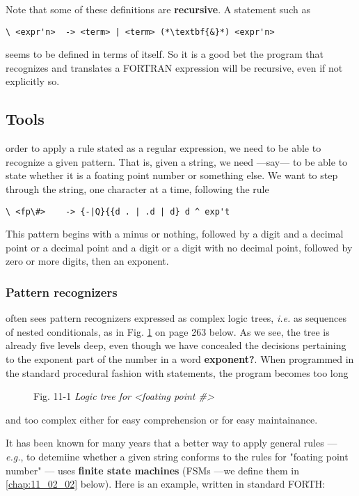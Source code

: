 Note that some of these definitions are \textbf{recursive}. A statement such as

\begin{verbatim}
\ <expr'n>  -> <term> | <term> (*\textbf{&}*) <expr'n>
\end{verbatim}

seems to be defined in terms of itself. So it is a good bet the program that recognizes and translates a FORTRAN expression will be recursive, even if not explicitly so.

\subsection{Tools}
 order to apply a rule stated as a regular expression, we need to be able to recognize a given pattern. That is, given a string, we need —say— to be able to state whether it is a foating point number or something else. We want to step through the string, one character at a time, following the rule

\begin{verbatim}
\ <fp\#>    -> {-|Q}{{d . | .d | d} d ^ exp't
\end{verbatim}

This pattern begins with a minus or nothing, followed by a digit and a decimal point or a decimal point and a digit or a digit with no decimal point, followed by zero or more digits, then an exponent.

\subsubsection{Pattern recognizers}
 often sees pattern recognizers expressed as complex logic trees, \textit{i.e.} as sequences of nested conditionals, as in Fig. \ref{fig:11_01} on page 263 below. As we see, the tree is already five levels deep, even though we have concealed the decisions pertaining to the exponent part of the number in a word \textbf{exponent?}. When programmed in the standard procedural fashion with  statements, the program becomes too long

\begin{figure}
    \caption{Fig. 11-1 \textit{Logic tree for <foating point \#>}}
    \label{fig:11_01}
\end{figure}

and too complex either for easy comprehension or for easy maintainance.

It has been known for many years that a better way to apply general rules — \textit{e.g.}, to detemiine whether a given string conforms to the rules for "foating point number" --- uses \textbf{finite state machines} (FSMs —we define them in \ref{chap:11_02_02} below). Here is an example, written in standard FORTH:


